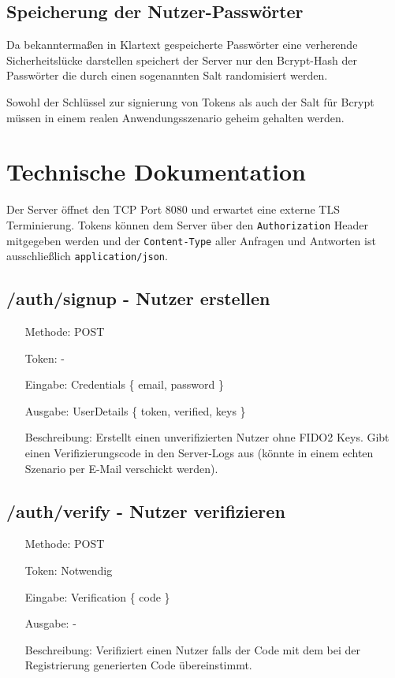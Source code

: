 \documentclass[journal]{IEEEtran}
\begin{document}
\subsection{Speicherung der Nutzer-Passwörter}

Da bekanntermaßen in Klartext gespeicherte Passwörter eine verherende
Sicherheitslücke darstellen speichert der Server nur den Bcrypt-Hash der
Passwörter die durch einen sogenannten Salt randomisiert werden.

Sowohl der Schlüssel zur signierung von Tokens als auch der Salt für Bcrypt
müssen in einem realen Anwendungsszenario geheim gehalten werden.



\section{Technische Dokumentation}

Der Server öffnet den TCP Port 8080 und erwartet eine externe TLS
Terminierung. Tokens können dem Server über den \texttt{Authorization} Header
mitgegeben werden und der \texttt{Content-Type} aller Anfragen und Antworten
ist ausschließlich \texttt{application/json}.

\subsection{/auth/signup - Nutzer erstellen}

\begin{itemize}
	\setlength{\leftskip}{1.5cm}
	\setlength{\itemsep}{0pt}
	\item[Methode:] POST
	\item[Token:] -
	\item[Eingabe:] Credentials \{ email, password \}
	\item[Ausgabe:] UserDetails \{ token, verified, keys \}
	\item[Beschreibung:] Erstellt einen unverifizierten Nutzer ohne FIDO2 Keys.
		Gibt einen Verifizierungscode in den Server-Logs aus (könnte in einem
		echten Szenario per E-Mail verschickt werden).
\end{itemize}

\subsection{/auth/verify - Nutzer verifizieren}

\begin{itemize}
	\setlength{\leftskip}{1.5cm}
	\setlength{\itemsep}{0pt}
	\item[Methode:] POST
	\item[Token:] Notwendig
	\item[Eingabe:] Verification \{ code \}
	\item[Ausgabe:] -
	\item[Beschreibung:] Verifiziert einen Nutzer falls der Code mit dem bei
		der Registrierung generierten Code übereinstimmt.
\end{itemize}
\end{document}
